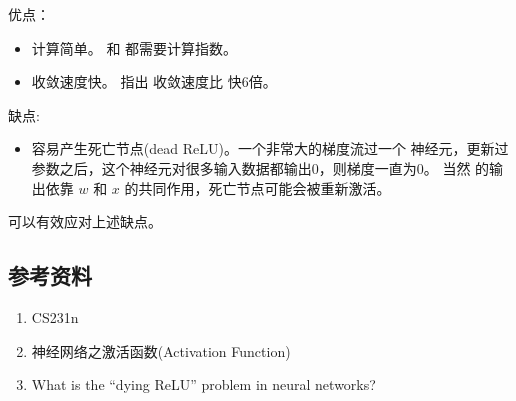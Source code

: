 \documentclass[letterpaper,10pt,english]{sphinxmanual}
\let\sphinxpxdimen\pdfpxdimen\else\newdimen\sphinxpxdimen
\begin{document}
优点：
\begin{itemize}
\item {} 
计算简单。  和  都需要计算指数。

\item {} 
收敛速度快。  指出  收敛速度比  快6倍。
\begin{quote}

\noindent{\hspace*{\fill}\sphinxincludegraphics[width=500\sphinxpxdimen]{{02_alexplot}.jpeg}\hspace*{\fill}}
\end{quote}

\end{itemize}

缺点:
\begin{itemize}
\item {} 
容易产生死亡节点(dead ReLU)。一个非常大的梯度流过一个  神经元，更新过参数之后，这个神经元对很多输入数据都输出0，则梯度一直为0。
当然  的输出依靠 \(w\) 和 \(x\) 的共同作用，死亡节点可能会被重新激活。

\end{itemize}

 可以有效应对上述缺点。


\subsection{参考资料}
\label{\detokenize{deepLearning/02_activationFunction:id2}}\begin{enumerate}
\item {} 
CS231n

\end{enumerate}
\begin{quote}

\end{quote}
\begin{enumerate}
\setcounter{enumi}{1}
\item {} 
神经网络之激活函数(Activation Function)

\end{enumerate}
\begin{quote}

\end{quote}
\begin{enumerate}
\setcounter{enumi}{2}
\item {} 
What is the “dying ReLU” problem in neural networks?

\end{enumerate}
\begin{quote}

\end{quote}
\end{document}
